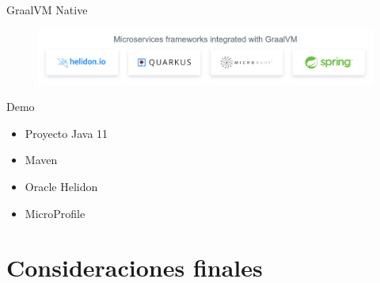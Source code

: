 \documentclass[aspectratio=169]{beamer}
\begin{document}
\begin{frame}{GraalVM Native}
	\begin{figure}
		\centering
		\includegraphics[width=\linewidth]{Images/implementacionesnative}
	\end{figure}
\end{frame}

\begin{frame}{Demo}
	\begin{itemize}
		\item Proyecto Java 11
		\item Maven
		\item Oracle Helidon
        \item MicroProfile
	\end{itemize}
\end{frame}



{
	\section{Consideraciones finales}
}
\end{document}
